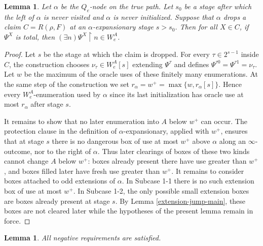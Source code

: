 \documentclass[10pt,a4paper]{amsart}
\newtheorem{lemma}[theorem]{Lemma}
\begin{document}
\begin{lemma}\label{disposal-main}
Let $\alpha$ be the $Q_e$-node on the true path.  Let $s_0$ be a stage after
which the left of $\alpha$ is never visited and $\alpha$ is never initialized.
Suppose that $\alpha$ drops a claim $C=R(\rho,F)$ at an
$\alpha$-expansionary stage $s>s_0$.  Then for all $X \in C$, if $\Psi^X$ is total, then $(\exists n)\Psi^X\upharpoonright n\in W_e^A$.

\end{lemma}

\begin{proof}
Let $s$ be the stage at which the claim is dropped.  For every
$\tau\in2^{s-1}$ inside $C$, the construction chooses
$\nu_\tau\in W_e^A[s]$ extending $\Psi^\tau$ and defines
$\Psi^{\tau0}=\Psi^{\tau1}=\nu_\tau$.  Let $w$ be the maximum of the oracle
uses of these finitely many enumerations.
At the same step of the construction we set $r_\alpha=w^+=\max\{w,r_\alpha[s]\}$.  Hence every
$W_e^A$-enumeration used by $\alpha$ since its last initialization has oracle use
at most $r_\alpha$ after stage $s$.

It remains to show that no later enumeration into $A$ below $w^+$ can occur.  The
protection clause in the definition of $\alpha$-expansionary, applied with
$w^+$, ensures that at stage $s$ there is no dangerous box of use at most
$w^+$ above $\alpha$ along an $\infty$-outcome, nor to the right of $\alpha$.
Thus later clearings of boxes of these two kinds cannot change $A$ below
$w^+$: boxes already present there have use greater than $w^+$, and boxes filled
later have fresh use greater than $w^+$.
It remains to consider boxes attached to odd extensions of $\alpha$.  In
Subcase 1-1 there is no such extension box of use at most $w^+$. In Subcase 1-2, the only possible small extension boxes are boxes already
present at stage $s$.  By Lemma \ref{extension-jump-main}, these boxes are not
cleared later while the hypotheses of the present lemma remain in force. 
\end{proof}

\begin{lemma}\label{negative-main}
All negative requirements are satisfied.
\end{lemma}
\end{document}
